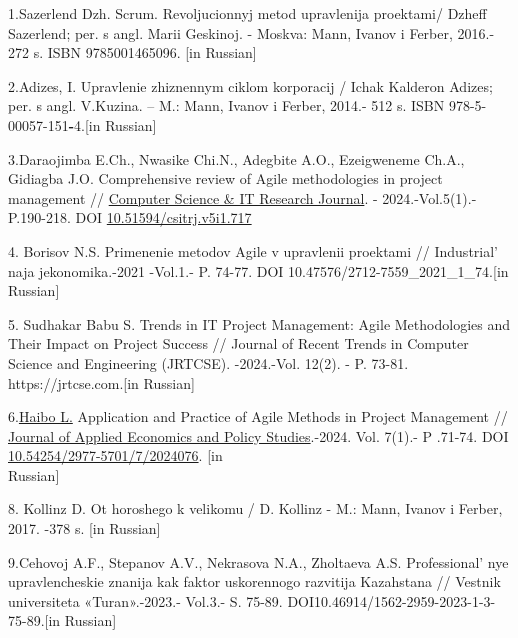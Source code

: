 \begin{references}

1.Sazerlend Dzh. Scrum. Revoljucionnyj metod upravlenija proektami/
Dzheff Sazerlend; per. s angl. Marii Geskinoj. - Moskva: Mann, Ivanov i
Ferber, 2016.- 272 s. ISBN 9785001465096.
{[}in Russian{]}

2.Adizes, I. Upravlenie zhiznennym ciklom korporacij / Ichak Kalderon
Adizes; per. s angl. V.Kuzina. -- M.: Mann, Ivanov i Ferber, 2014.- 512
s. ISBN 978-5-00057-151{\bfseries -}4.{[}in Russian{]}

3.Daraojimba E.Ch., Nwasike Chi.N., Adegbite A.O., Ezeigweneme Ch.A.,
Gidiagba J.O. Comprehensive review of Agile methodologies in project
management //
\href{https://www.researchgate.net/journal/Computer-Science-IT-Research-Journal-2709-0051?_tp=eyJjb250ZXh0Ijp7ImZpcnN0UGFnZSI6Il9kaXJlY3QiLCJwYWdlIjoicHVibGljYXRpb24iLCJwcmV2aW91c1BhZ2UiOiJfZGlyZWN0In19}{Computer
Science \& IT Research Journal}. - 2024.-Vol.5(1).- P.190-218. DOI
\href{http://dx.doi.org/10.51594/csitrj.v5i1.717}{10.51594/csitrj.v5i1.717}

4. Borisov N.S. Primenenie metodov Agile v upravlenii proektami //
Industrial' naja jekonomika.-2021 -Vol.1.- P. 74-77. DOI
10.47576/2712-7559\_2021\_1\_74.{[}in Russian{]}

5. Sudhakar Babu S. Trends in IT Project Management: Agile Methodologies
and Their Impact on Project Success // Journal of Recent Trends in
Computer Science and Engineering (JRTCSE). -2024.-Vol. 12(2). - P.
73-81. https://jrtcse.com.{[}in Russian{]}

6.\href{https://www.researchgate.net/scientific-contributions/Haibo-Li-2290691805?_tp=eyJjb250ZXh0Ijp7ImZpcnN0UGFnZSI6Il9kaXJlY3QiLCJwYWdlIjoicHVibGljYXRpb24iLCJwcmV2aW91c1BhZ2UiOiJfZGlyZWN0In19}{Haibo
L.} Application and Practice of Agile Methods in Project Management //
\href{https://www.researchgate.net/journal/Journal-of-Applied-Economics-and-Policy-Studies-2977-571X?_tp=eyJjb250ZXh0Ijp7ImZpcnN0UGFnZSI6Il9kaXJlY3QiLCJwYWdlIjoicHVibGljYXRpb24iLCJwcmV2aW91c1BhZ2UiOiJfZGlyZWN0In19}{Journal
of Applied Economics and Policy Studies}.-2024. Vol. 7(1).- P .71-74.
DOI
\href{http://dx.doi.org/10.54254/2977-5701/7/2024076}{10.54254/2977-5701/7/2024076}.
{[}in\\ Russian{]}

8. Kollinz D. Ot horoshego k velikomu / D. Kollinz - M.: Mann, Ivanov i
Ferber, 2017. -378 s. {[}in Russian{]}

9.Cehovoj A.F., Stepanov A.V., Nekrasova N.A., Zholtaeva A.S.
Professional' nye upravlencheskie znanija kak faktor
uskorennogo razvitija Kazahstana // Vestnik universiteta «Turan».-2023.-
Vol.3.- S. 75-89. DOI10.46914/1562-2959-2023-1-3-75-89.{[}in Russian{]}


\end{references}
